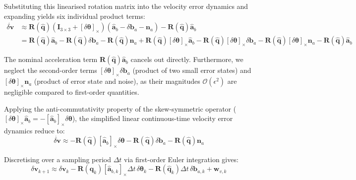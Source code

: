 \documentclass{article}
\begin{document}
	Substituting this linearised rotation matrix into the velocity error dynamics and expanding yields six individual product terms:
	\begin{align*}
		\dot{\delta\mathbf{v}} &\approx \mathbf{R}(\hat{\mathbf{q}}) \left( \mathbf{I}_{3 \times 3} + [\delta\bm{\theta}]_\times \right) (\hat{\mathbf{a}}_b - \delta\mathbf{b}_a - \mathbf{n}_a) - \mathbf{R}(\hat{\mathbf{q}}) \hat{\mathbf{a}}_b \\
		&= \mathbf{R}(\hat{\mathbf{q}}) \hat{\mathbf{a}}_b - \mathbf{R}(\hat{\mathbf{q}}) \delta\mathbf{b}_a - \mathbf{R}(\hat{\mathbf{q}}) \mathbf{n}_a + \mathbf{R}(\hat{\mathbf{q}}) [\delta\bm{\theta}]_\times \hat{\mathbf{a}}_b - \mathbf{R}(\hat{\mathbf{q}}) [\delta\bm{\theta}]_\times \delta\mathbf{b}_a - \mathbf{R}(\hat{\mathbf{q}}) [\delta\bm{\theta}]_\times \mathbf{n}_a - \mathbf{R}(\hat{\mathbf{q}}) \hat{\mathbf{a}}_b
	\end{align*}
	
	The nominal acceleration term $\mathbf{R}(\hat{\mathbf{q}}) \hat{\mathbf{a}}_b$ cancels out directly. Furthermore, we neglect the second-order terms $[\delta\bm{\theta}]_\times \delta\mathbf{b}_a$ (product of two small error states) and $[\delta\bm{\theta}]_\times \mathbf{n}_a$ (product of error state and noise), as their magnitudes $\mathcal{O}(\epsilon^2)$ are negligible compared to first-order quantities. 
	
	Applying the anti-commutativity property of the skew-symmetric operator ($[\delta\bm{\theta}]_\times \hat{\mathbf{a}}_b = -[\hat{\mathbf{a}}_b]_\times \delta\bm{\theta}$), the simplified linear continuous-time velocity error dynamics reduce to:
	\begin{equation*}
		\dot{\delta\mathbf{v}} \approx -\mathbf{R}(\hat{\mathbf{q}}) [\hat{\mathbf{a}}_b]_\times \delta\bm{\theta} - \mathbf{R}(\hat{\mathbf{q}}) \delta\mathbf{b}_a - \mathbf{R}(\hat{\mathbf{q}}) \mathbf{n}_a
	\end{equation*}
	
	Discretising over a sampling period $\Delta t$ via first-order Euler integration gives:
	\begin{equation*}
		\delta\mathbf{v}_{k+1} \approx \delta\mathbf{v}_k - \mathbf{R}(\hat{\mathbf{q}}_k) [\hat{\mathbf{a}}_{b,k}]_\times \Delta t \, \delta\bm{\theta}_k - \mathbf{R}(\hat{\mathbf{q}}_k) \Delta t \, \delta\mathbf{b}_{a,k} + \mathbf{w}_{v,k}
	\end{equation*}
	
\end{document}
